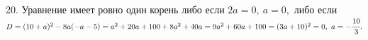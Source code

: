 20. Уравнение имеет ровно один корень либо если $2a=0,\ a=0,$ либо если $D=(10+a)^2-8a(-a-5)=a^2+20a+100+8a^2+40a=9a^2+60a+100=(3a+10)^2=0,\ a=-\cfrac{10}{3}.$\\
